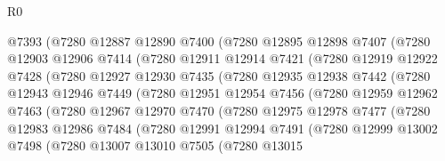 \begin{lexlean}{R0}
\begin{coremodule}
                @7393
                (@7280
                  @12887
                  @12890
                  @7400
                  (@7280
                    @12895
                    @12898
                    @7407
                    (@7280
                      @12903
                      @12906
                      @7414
                      (@7280
                        @12911
                        @12914
                        @7421
                        (@7280
                          @12919
                          @12922
                          @7428
                          (@7280
                            @12927
                            @12930
                            @7435
                            (@7280
                              @12935
                              @12938
                              @7442
                              (@7280
                                @12943
                                @12946
                                @7449
                                (@7280
                                  @12951
                                  @12954
                                  @7456
                                  (@7280
                                    @12959
                                    @12962
                                    @7463
                                    (@7280
                                      @12967
                                      @12970
                                      @7470
                                      (@7280
                                        @12975
                                        @12978
                                        @7477
                                        (@7280
                                          @12983
                                          @12986
                                          @7484
                                          (@7280
                                            @12991
                                            @12994
                                            @7491
                                            (@7280
                                              @12999
                                              @13002
                                              @7498
                                              (@7280
                                                @13007
                                                @13010
                                                @7505
                                                (@7280
                                                  @13015

\end{coremodule}
\end{lexlean}
